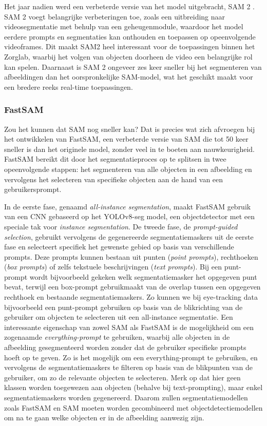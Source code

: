 Het jaar nadien werd een verbeterde versie van het model uitgebracht, SAM 2 \autocite{Ravi2024}. 
SAM 2 voegt belangrijke verbeteringen toe, zoals een uitbreiding naar videosegmentatie met behulp van een geheugenmodule, waardoor het model eerdere prompts en segmentaties kan onthouden en toepassen op opeenvolgende videoframes. 
Dit maakt SAM2 heel interessant voor de toepassingen binnen het Zorglab, waarbij het volgen van objecten doorheen de video een belangrijke rol kan spelen.
Daarnaast is SAM 2 ongeveer zes keer sneller bij het segmenteren van afbeeldingen dan het oorspronkelijke SAM-model, wat het geschikt maakt voor een bredere reeks real-time toepassingen.

\subsubsection{FastSAM}

Zou het kunnen dat SAM nog sneller kan? 
Dat is precies wat \textcite{Zhao2023} zich afvroegen bij het ontwikkelen van FastSAM, een verbeterde versie van SAM die tot 50 keer sneller is dan het originele model, zonder veel in te boeten aan nauwkeurigheid.
FastSAM bereikt dit door het segmentatieproces op te splitsen in twee opeenvolgende stappen: het segmenteren van alle objecten in een afbeelding en vervolgens het selecteren van specifieke objecten aan de hand van een gebruikersprompt.

In de eerste fase, genaamd \textit{all-instance segmentation}, maakt FastSAM gebruik van een CNN gebaseerd op het YOLOv8-seg model, een objectdetector met een speciale tak voor \textit{instance segmentation}. 
De tweede fase, de \textit{prompt-guided selection}, gebruikt vervolgens de gegenereerde segmentatiemaskers uit de eerste fase en selecteert specifiek het gewenste gebied op basis van verschillende prompts. 
Deze prompts kunnen bestaan uit punten (\textit{point prompts}), rechthoeken (\textit{box prompts}) of zelfs tekstuele beschrijvingen (\textit{text prompts}). 
Bij een punt-prompt wordt bijvoorbeeld gekeken welk segmentatiemasker het opgegeven punt bevat, terwijl een box-prompt gebruikmaakt van de overlap tussen een opgegeven rechthoek en bestaande segmentatiemaskers.
Zo kunnen we bij eye-tracking data bijvoorbeeld een punt-prompt gebruiken op basis van de blikrichting van de gebruiker om objecten te selecteren uit een all-instance segmentatie.
Een interessante eigenschap van zowel SAM als FastSAM is de mogelijkheid om een zogenaamde \textit{everything-prompt} te gebruiken, waarbij alle objecten in de afbeelding gesegmenteerd worden zonder dat de gebruiker specifieke prompts hoeft op te geven.
Zo is het mogelijk om een everything-prompt te gebruiken, en vervolgens de segmentatiemaskers te filteren op basis van de blikpunten van de gebruiker, om zo de relevante objecten te selecteren.
Merk op dat hier geen klassen worden toegewezen aan objecten (behalve bij text-prompting), maar enkel segmentatiemaskers worden gegenereerd.
Daarom zullen segmentatiemodellen zoals FastSAM en SAM moeten worden gecombineerd met objectdetectiemodellen om na te gaan welke objecten er in de afbeelding aanwezig zijn.

